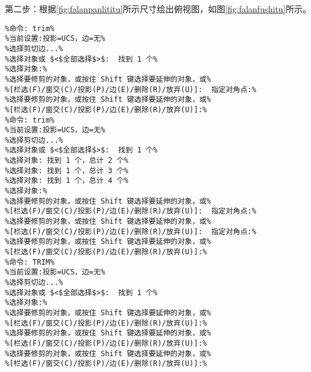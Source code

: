 \begin{figure}[htbp]
\centering
\begin{floatrow}
\end{floatrow}
\end{figure}

第二步：根据\ref{fig:falanpanlititu}所示尺寸绘出俯视图，如图\ref{fig:falanfushitu}所示。
\begin{lstlisting}
%命令: trim%
%当前设置:投影=UCS，边=无%
%选择剪切边...%
%选择对象或 $<$全部选择$>$:  找到 1 个%
%选择对象:%
%选择要修剪的对象，或按住 Shift 键选择要延伸的对象，或%
%[栏选(F)/窗交(C)/投影(P)/边(E)/删除(R)/放弃(U)]:  指定对角点:%
%选择要修剪的对象，或按住 Shift 键选择要延伸的对象，或%
%[栏选(F)/窗交(C)/投影(P)/边(E)/删除(R)/放弃(U)]:%
%命令: trim%
%当前设置:投影=UCS，边=无%
%选择剪切边...%
%选择对象或 $<$全部选择$>$:  找到 1 个%
%选择对象: 找到 1 个，总计 2 个%
%选择对象: 找到 1 个，总计 3 个%
%选择对象: 找到 1 个，总计 4 个%
%选择对象:%
%选择要修剪的对象，或按住 Shift 键选择要延伸的对象，或%
%[栏选(F)/窗交(C)/投影(P)/边(E)/删除(R)/放弃(U)]:  指定对角点:%
%选择要修剪的对象，或按住 Shift 键选择要延伸的对象，或%
%[栏选(F)/窗交(C)/投影(P)/边(E)/删除(R)/放弃(U)]:  指定对角点:%
%选择要修剪的对象，或按住 Shift 键选择要延伸的对象，或%
%[栏选(F)/窗交(C)/投影(P)/边(E)/删除(R)/放弃(U)]:%
%命令: TRIM%
%当前设置:投影=UCS，边=无%
%选择剪切边...%
%选择对象或 $<$全部选择$>$:  找到 1 个%
%选择对象:%
%选择要修剪的对象，或按住 Shift 键选择要延伸的对象，或%
%[栏选(F)/窗交(C)/投影(P)/边(E)/删除(R)/放弃(U)]:%
%选择要修剪的对象，或按住 Shift 键选择要延伸的对象，或%
%[栏选(F)/窗交(C)/投影(P)/边(E)/删除(R)/放弃(U)]:%
%选择要修剪的对象，或按住 Shift 键选择要延伸的对象，或%
%[栏选(F)/窗交(C)/投影(P)/边(E)/删除(R)/放弃(U)]:%
\end{lstlisting}

